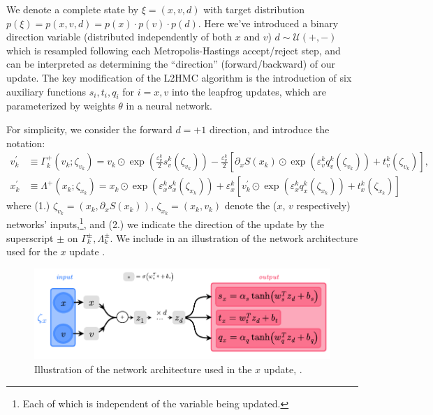 \documentclass{article} %
\begin{document}
We denote a complete state by \(\xi = (x, v, d)\) with target distribution \(p(\xi) = p(x, v, d) = p(x)\cdot p(v)\cdot
p(d)\).
%
Here we've introduced a binary direction variable (distributed independently of both \(x\) and \(v\))
\(d\sim\mathcal{U}(+,-)\) which is resampled following each Metropolis-Hastings accept/reject step, and can be
interpreted as determining the ``direction'' (forward/backward) of our update.
%
The key modification of the L2HMC algorithm is the introduction of six auxiliary functions \(s_{i}, t_{i}, q_{i}\) for \(i
= x, v\) into the leapfrog updates, which are parameterized by weights \(\theta\) in a neural network.
%

For simplicity, we consider the forward \(d=+1\) direction, and introduce the notation:
%
\begin{align}
   v^{\prime}_{k} &\equiv \Gamma^{+}_{k}(v_{k};\zeta_{v_{k}})
   = v_{k}\odot \exp{\left(\tfrac{\varepsilon^{k}_{v}}{2}s_{v}^{k}(\zeta_{v_{k}})\right)} -
   \tfrac{\varepsilon^{k}_{v}}{2}{\left[\partial_{x}S(x_{k})\odot\exp{\left(\varepsilon^{k}_{v} q_{v}^{k}(\zeta_{v_{k}})\right)}
      +t_{v}^{k}(\zeta_{v_{k}})\right]},\label{eq:new_momentum_update}\\
   x^{\prime}_{k} &\equiv \Lambda^{+}(x_{k};\zeta_{x_{k}})
   = x_{k}\odot\exp(\varepsilon^{k}_{x} s^{k}_{x}(\zeta_{x_{k}}))
   + \varepsilon^{k}_{x}\left[v^{\prime}_{k}\odot\exp(\varepsilon^{k}_{x} q^{k}_{x}(\zeta_{x_{k}}))
         + t^{k}_{x}(\zeta_{x_{k}})\right]\label{eq:new_position_update}
\end{align}
%
where (1.) \(\zeta_{v_{k}} = (x_{k}, \partial_{x}S(x_{k}))\), \(\zeta_{x_{k}} = (x_{k}, v_{k})\) denote the (\(x\),
\(v\) respectively) networks' inputs,\footnote{%
   Each of which is independent of the variable being updated.
}, and (2.) we indicate the direction of the update by the superscript \(\pm\) on \(\Gamma^{\pm}_{k},
\Lambda^{\pm}_{k}\).
%
We include in  an illustration of the network architecture used for the \(x\) update .
%
\begin{figure}[htpb]
   \centering
   \includegraphics[width=\textwidth]{figures/updated_network3.pdf}
   \caption{\label{fig:network}Illustration of the network architecture used in the \(x\) update, .}
\end{figure}
\end{document}
